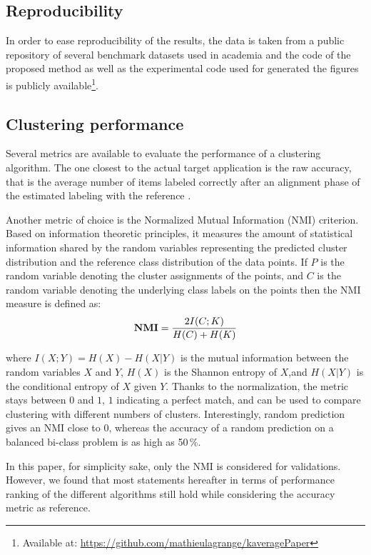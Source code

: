 \documentclass[natbib,smallextended]{svjour3}
\begin{document}
\subsection{Reproducibility}

In order to ease reproducibility of the results, the data is taken from a public repository of several benchmark datasets used in academia \cite{UCRArchive} and the code of the proposed method as well as the experimental code used for generated the figures is publicly available\footnote{Available at: \url{https://github.com/mathieulagrange/kaveragePaper}}.


\subsection{Clustering performance}

Several metrics are available to evaluate the performance of a clustering algorithm. The one closest to the actual target application is the raw accuracy, that is the average number of items labeled correctly after an alignment phase of the estimated labeling with the reference \citep{Kuhn1955Hungarian}.

Another metric of choice is the Normalized Mutual Information (NMI) criterion. Based on information theoretic principles, it measures the amount of statistical information shared by the random variables representing the predicted cluster distribution and the reference class distribution of the data points. If $P$ is the random variable denoting the cluster assignments of the points, and $C$ is the random variable denoting the underlying class labels on the points then the NMI measure is defined as:
\[
\textbf{NMI} = \frac{ 2\- I(C;K) }{H(C)+H(K)}
\]

where $I(X;Y)=H(X)−H(X|Y)$ is the mutual information between the random variables $X$ and $Y$, $H(X)$ is the Shannon entropy of $X$,and $H(X|Y)$ is the conditional entropy of $X$ given $Y$. Thanks to the normalization, the metric stays between $0$ and $1$, $1$ indicating a perfect match, and can be used to compare clustering with different numbers of clusters. Interestingly, random prediction gives an NMI close to $0$, whereas the accuracy of a random prediction on a balanced bi-class problem is as high as 50\,\%.

In this paper, for simplicity sake, only the NMI is considered for validations. However, we found that most statements hereafter in terms of performance ranking of the different algorithms still hold while considering the accuracy metric as reference.
\end{document}
